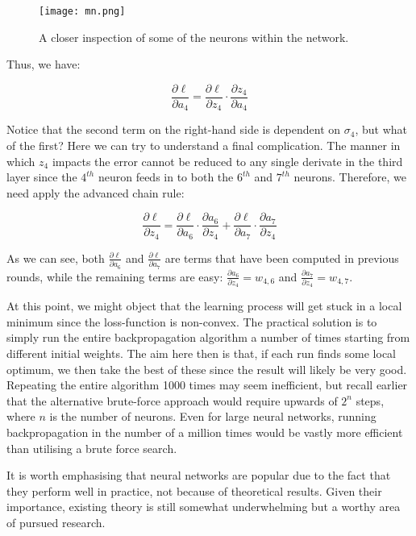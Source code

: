 \documentclass[11pt]{article}
\begin{document}
\begin{figure}[h]
    \centering
    \texttt{[image: mn.png]}
    \caption{A closer inspection of some of the neurons within the network.}   
\end{figure}

Thus, we have:

\begin{equation}\frac{\partial\ell }{\partial a_{4}} = \frac{\partial \ell}{\partial z_{4}} \cdot \frac{\partial z_{4}}{\partial a_{4}} \nonumber\end{equation}

Notice that the second term on the right-hand side is dependent on $\sigma_{4}$, but what of the first? Here we can try to understand a final complication. The manner in which $z_{4}$ impacts the error cannot be reduced to any single derivate in the third layer since the $4^{th}$ neuron feeds in to both the $6^{th}$ and $7^{th}$ neurons. Therefore, we need apply the advanced chain rule:

\begin{equation}\frac{\partial \ell}{\partial z_{4}}= \frac{\partial \ell }{\partial a_{6}} \cdot \frac{\partial a_{6}}{\partial z_{4}}+ \frac{\partial \ell}{\partial a_{7}} \cdot \frac{\partial a_{7}}{\partial z_{4}} \nonumber\end{equation}

As we can see, both $\frac{\partial \ell }{\partial a_{6}}$ and $\frac{\partial \ell}{\partial a_{7}}$ are terms that have been computed in previous rounds, while the remaining terms are easy: $\frac{\partial a_{6}}{\partial z_{4}} = w_{4, 6}$ and $\frac{\partial a_{7}}{\partial z_{4}}=w_{4, 7}$.

At this point, we might object that the learning process will get stuck in a local minimum since the loss-function is non-convex. The practical solution is to simply run the entire backpropagation algorithm a number of times starting from different initial weights. The aim here then is that, if each run finds some local optimum, we then take the best of these since the result will likely be very good. Repeating the entire algorithm 1000 times may seem inefficient, but recall earlier that the alternative brute-force approach would require upwards of $2^{n}$ steps, where $n$ is the number of neurons. Even for large neural networks, running backpropagation in the number of a million times would be vastly more efficient than utilising a brute force search.

It is worth emphasising that neural networks are popular due to the fact that they perform well in practice, not because of theoretical results. Given their importance, existing theory is still somewhat underwhelming but a worthy area of pursued research.
\end{document}
